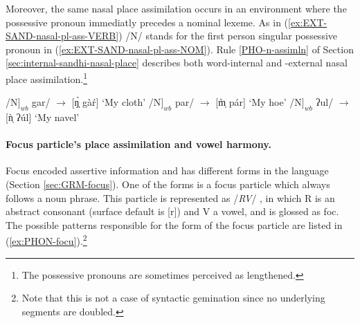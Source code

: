 Moreover,  the same nasal place assimilation occurs in an environment where the
possessive pronoun  immediatly precedes a nominal lexeme. As in 
(\ref{ex:EXT-SAND-nasal-pl-ass-VERB})  /N/  stands for the  first person
singular
possessive pronoun  in
(\ref{ex:EXT-SAND-nasal-pl-ass-NOM}). Rule \ref{PHO-n-assimln} of Section
\ref{sec:internal-sandhi-nasal-place}  describes both word-internal and
 -external nasal place assimilation.\footnote{The possessive pronouns 
are sometimes perceived as lengthened.}

\begin{exe}
\ex\label{ex:EXT-SAND-nasal-pl-ass-NOM} 
\begin{xlist}
 \ex\label{ex:EXT-SAND-N} 
/N$]_{wb}$ gar/ $\rightarrow$ [ŋ̩̀ gàŕ]  {\rm  `My cloth'}
 \ex\label{ex:EXT-SAND-m} 
/N$]_{wb}$ par/ $\rightarrow$ [m̩̀ pár]  {\rm  `My hoe'}
 \ex\label{ex:EXT-SAND-n} 
/N$]_{wb}$ ʔul/ $\rightarrow$ [ǹ̩ ʔúl] {\rm  `My navel'}
\end{xlist}
\end{exe}



\paragraph{Focus particle's place assimilation and vowel harmony.}
\label{sec:focus-forms}

Focus encoded assertive information and has different forms in the language 
(Section \ref{sec:GRM-focus}). One of the forms is a  focus particle which 
always follows a noun phrase. This particle is represented as /{\it RV}/ , in 
which R is an abstract consonant (surface default is [{\sls r}]) and V a vowel, 
and  is glossed as {\sc foc}. The possible patterns responsible for the form of 
the focus particle are listed in (\ref{ex:PHON-focu}).\footnote{Note that this 
is not a case of syntactic gemination since no underlying segments are doubled.}

